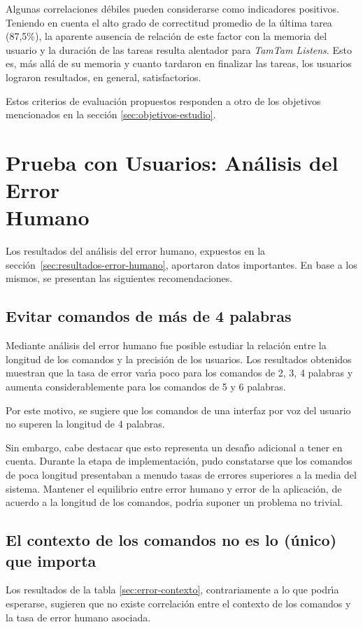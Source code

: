 Algunas correlaciones d\'ebiles pueden considerarse como indicadores positivos. Teniendo en cuenta
el alto grado de correctitud promedio de la \'ultima tarea (87,5\%), la aparente ausencia de relaci\'on 
de este factor con la memoria del usuario y la duraci\'on de las tareas resulta alentador para
\emph{TamTam Listens}. Esto es, m\'as all\'a de su memoria y cuanto tardaron en finalizar las tareas,
los usuarios lograron resultados, en general, satisfactorios.

Estos criterios de evaluaci\'on propuestos responden a otro de los objetivos mencionados
en la secci\'on \ref{sec:objetivos-estudio}.

\section[Prueba con Usuarios: An\'alisis del Error Humano]
{Prueba con Usuarios: An\'alisis del Error \\ Humano}
Los resultados del an\'alisis del error humano, expuestos en la secci\'on~\ref{sec:resultados-error-humano},
aportaron datos importantes. En base a los mismos, se presentan las siguientes recomendaciones.

\subsection{Evitar comandos de m\'as de 4 palabras}
Mediante an\'alisis del error humano fue posible estudiar la relaci\'on entre la longitud de los comandos
y la precisi\'on de los usuarios. Los resultados obtenidos muestran que la tasa de error
var{{\'\i}}a poco para los comandos de 2, 3, 4 palabras y aumenta considerablemente para los comandos
de 5 y 6 palabras.

Por este motivo, se sugiere que los comandos de una interfaz por voz del usuario 
no superen la longitud de 4 palabras.

Sin embargo, cabe destacar que esto representa un desaf{{\'\i}}o adicional a tener en cuenta.
Durante la etapa de implementaci\'on, pudo constatarse que los comandos de poca longitud presentaban
a menudo tasas de errores superiores a la media del sistema.
Mantener el equilibrio entre error humano y error de la aplicaci\'on, de acuerdo a la longitud
de los comandos, podr{{\'\i}}a suponer un problema no trivial. 

\subsection{El contexto de los comandos no es lo (\'unico) que importa}
Los resultados de la tabla \ref{sec:error-contexto}, contrariamente a lo que podr{\'\i}a esperarse,
sugieren que no existe correlaci\'on entre el contexto de los comandos y la tasa de error humano asociada.

